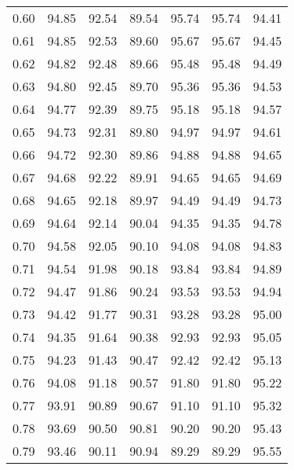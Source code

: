 \begin{tabular}{|c|c|c|c|c|c|c|}
      0.60 &     94.85 &     92.54 &      89.54 &   95.74 &      95.74 &         94.41 \\
      0.61 &     94.85 &     92.53 &      89.60 &   95.67 &      95.67 &         94.45 \\
      0.62 &     94.82 &     92.48 &      89.66 &   95.48 &      95.48 &         94.49 \\
      0.63 &     94.80 &     92.45 &      89.70 &   95.36 &      95.36 &         94.53 \\
      0.64 &     94.77 &     92.39 &      89.75 &   95.18 &      95.18 &         94.57 \\
      0.65 &     94.73 &     92.31 &      89.80 &   94.97 &      94.97 &         94.61 \\
      0.66 &     94.72 &     92.30 &      89.86 &   94.88 &      94.88 &         94.65 \\
      0.67 &     94.68 &     92.22 &      89.91 &   94.65 &      94.65 &         94.69 \\
      0.68 &     94.65 &     92.18 &      89.97 &   94.49 &      94.49 &         94.73 \\
      0.69 &     94.64 &     92.14 &      90.04 &   94.35 &      94.35 &         94.78 \\
      0.70 &     94.58 &     92.05 &      90.10 &   94.08 &      94.08 &         94.83 \\
      0.71 &     94.54 &     91.98 &      90.18 &   93.84 &      93.84 &         94.89 \\
      0.72 &     94.47 &     91.86 &      90.24 &   93.53 &      93.53 &         94.94 \\
      0.73 &     94.42 &     91.77 &      90.31 &   93.28 &      93.28 &         95.00 \\
      0.74 &     94.35 &     91.64 &      90.38 &   92.93 &      92.93 &         95.05 \\
      0.75 &     94.23 &     91.43 &      90.47 &   92.42 &      92.42 &         95.13 \\
      0.76 &     94.08 &     91.18 &      90.57 &   91.80 &      91.80 &         95.22 \\
      0.77 &     93.91 &     90.89 &      90.67 &   91.10 &      91.10 &         95.32 \\
      0.78 &     93.69 &     90.50 &      90.81 &   90.20 &      90.20 &         95.43 \\
      0.79 &     93.46 &     90.11 &      90.94 &   89.29 &      89.29 &         95.55 \\

\end{tabular}
